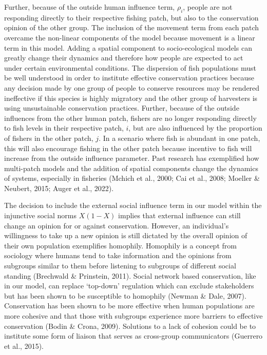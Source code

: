 \documentclass[
  12pt,
]{article}
\begin{document}
Further, because of the outside human influence term, \(\rho_i\), people are not responding directly to their respective fishing patch, but also to the conservation opinion of the other group. The inclusion of the movement term from each patch overcame the non-linear components of the model because movement is a linear term in this model. Adding a spatial component to socio-ecological models can greatly change their dynamics and therefore how people are expected to act under certain environmental conditions. The dispersion of fish populations must be well understood in order to institute effective conservation practices because any decision made by one group of people to conserve resources may be rendered ineffective if this species is highly migratory and the other group of harvesters is using unsustainable conservation practices. Further, because of the outside influences from the other human patch, fishers are no longer responding directly to fish levels in their respective patch, \(i\), but are also influenced by the proportion of fishers in the other patch, \(j\). In a scenario where fish is abundant in one patch, this will also encourage fishing in the other patch because incentive to fish will increase from the outside influence parameter. Past research has exemplified how multi-patch models and the addition of spatial components change the dynamics of systems, especially in fisheries (Mchich et al., 2000; Cai et al., 2008; Moeller \& Neubert, 2015; Auger et al., 2022).

The decision to include the external social influence term in our model within the injunctive social norms \(X(1-X)\) implies that external influence can still change an opinion for or against conservation. However, an individual's willingness to take up a new opinion is still dictated by the overall opinion of their own population exemplifies homophily. Homophily is a concept from sociology where humans tend to take information and the opinions from subgroups similar to them before listening to subgroups of different social standing (Brechwald \& Prinstein, 2011). Social network based conservation, like in our model, can replace `top-down' regulation which can exclude stakeholders but has been shown to be susceptible to homophily (Newman \& Dale, 2007). Conservation has been shown to be more effective when human populations are more cohesive and that those with subgroups experience more barriers to effective conservation (Bodin \& Crona, 2009). Solutions to a lack of cohesion could be to institute some form of liaison that serves as cross-group communicators (Guerrero et al., 2015).
\end{document}
